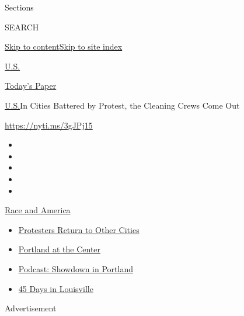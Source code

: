 Sections

SEARCH

\protect\hyperlink{site-content}{Skip to
content}\protect\hyperlink{site-index}{Skip to site index}

\href{https://www.nytimes.com/section/us}{U.S.}

\href{https://myaccount.nytimes.com/auth/login?response_type=cookie\&client_id=vi}{}

\href{https://www.nytimes.com/section/todayspaper}{Today's Paper}

\href{/section/us}{U.S.}\textbar{}In Cities Battered by Protest, the
Cleaning Crews Come Out

\url{https://nyti.ms/3gJPj15}

\begin{itemize}
\item
\item
\item
\item
\item
\end{itemize}

\href{https://www.nytimes.com/news-event/george-floyd-protests-minneapolis-new-york-los-angeles?action=click\&pgtype=Article\&state=default\&region=TOP_BANNER\&context=storylines_menu}{Race
and America}

\begin{itemize}
\tightlist
\item
  \href{https://www.nytimes.com/2020/07/26/us/protests-portland-seattle-trump.html?action=click\&pgtype=Article\&state=default\&region=TOP_BANNER\&context=storylines_menu}{Protesters
  Return to Other Cities}
\item
  \href{https://www.nytimes.com/2020/07/24/us/portland-oregon-protests-white-race.html?action=click\&pgtype=Article\&state=default\&region=TOP_BANNER\&context=storylines_menu}{Portland
  at the Center}
\item
  \href{https://www.nytimes.com/2020/07/23/podcasts/the-daily/portland-protests.html?action=click\&pgtype=Article\&state=default\&region=TOP_BANNER\&context=storylines_menu}{Podcast:
  Showdown in Portland}
\item
  \href{https://www.nytimes.com/interactive/2020/07/16/us/black-lives-matter-protests-louisville-breonna-taylor.html?action=click\&pgtype=Article\&state=default\&region=TOP_BANNER\&context=storylines_menu}{45
  Days in Louisville}
\end{itemize}

Advertisement

